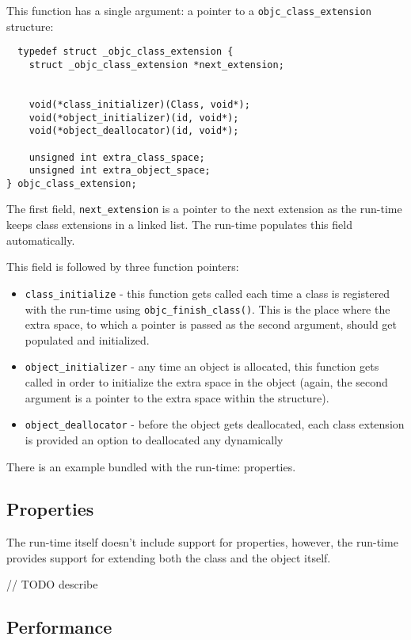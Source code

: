 This function has a single argument: a pointer to a \verb=objc_class_extension= structure:

\begin{verbatim}
  typedef struct _objc_class_extension {
	struct _objc_class_extension *next_extension;


	void(*class_initializer)(Class, void*);
	void(*object_initializer)(id, void*);
	void(*object_deallocator)(id, void*);
	
	unsigned int extra_class_space;
	unsigned int extra_object_space;
} objc_class_extension;
\end{verbatim}

The first field, \verb=next_extension= is a pointer to the next extension as the run-time keeps class extensions in a linked list. The run-time populates this field automatically.

This field is followed by three function pointers:

\begin{itemize}
  \item \verb=class_initialize= - this function gets called each time a class is registered with the run-time using \verb=objc_finish_class()=. This is the place where the extra space, to which a pointer is passed as the second argument, should get populated and initialized.
  \item \verb=object_initializer= - any time an object is allocated, this function gets called in order to initialize the extra space in the object (again, the second argument is a pointer to the extra space within the structure).
  \item \verb=object_deallocator= - before the object gets deallocated, each class extension is provided an option to deallocated any dynamically 
\end{itemize}


There is an example bundled with the run-time: properties.

\subsection{Properties}

The run-time itself doesn't include support for properties, however, the run-time provides support for extending both the class and the object itself.

// TODO describe


\subsection{Performance}